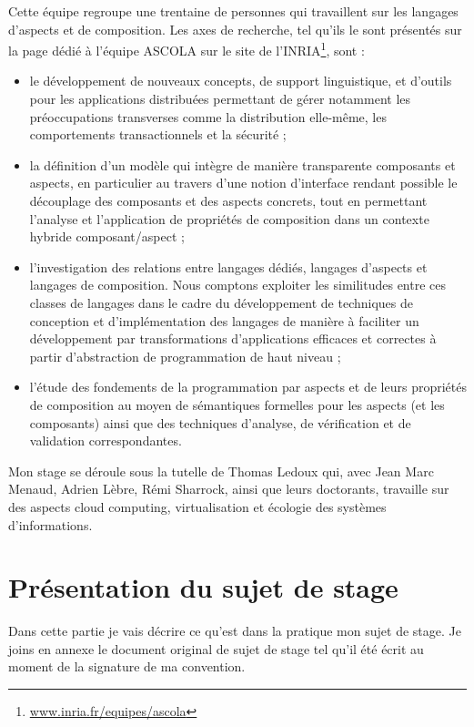 \documentclass[a4paper, 11pt]{report}
\begin{document}
Cette équipe regroupe une trentaine de personnes qui travaillent sur les langages d'aspects et de composition. Les axes de recherche, tel qu'ils le sont présentés sur la page dédié à l'équipe ASCOLA sur le site de l'INRIA\footnote{\href{http://www.inria.fr/equipes/ascola}{www.inria.fr/equipes/ascola}}, sont :
\begin{itemize}
	\item le développement de nouveaux concepts, de support linguistique, et d'outils pour les applications distribuées permettant de gérer notamment les préoccupations transverses comme la distribution elle-même, les comportements transactionnels et la sécurité ;
	\item la définition d'un modèle qui intègre de manière transparente composants et aspects, en particulier au travers d'une notion d'interface rendant possible le découplage des composants et des aspects concrets, tout en permettant l'analyse et l'application de propriétés de composition dans un contexte hybride composant/aspect ;
	\item l'investigation des relations entre langages dédiés, langages d'aspects et langages de composition. Nous comptons exploiter les similitudes entre ces classes de langages dans le cadre du développement de techniques de conception et d'implémentation des langages de manière à faciliter un développement par transformations d'applications efficaces et correctes à partir d'abstraction de programmation de haut niveau ;
	\item l'étude des fondements de la programmation par aspects et de leurs propriétés de composition au moyen de sémantiques formelles pour les aspects (et les composants) ainsi que des techniques d'analyse, de vérification et de validation correspondantes.
\end{itemize}

Mon stage se déroule sous la tutelle de Thomas Ledoux qui, avec Jean Marc Menaud, Adrien Lèbre, Rémi Sharrock, ainsi que leurs doctorants, travaille sur des aspects cloud computing, virtualisation et écologie des systèmes d'informations.

	\section{Présentation du sujet de stage}
Dans cette partie je vais décrire ce qu'est dans la pratique mon sujet de stage. Je joins en annexe le document original de sujet de stage tel qu'il été écrit au moment de la signature de ma convention.
\end{document}
